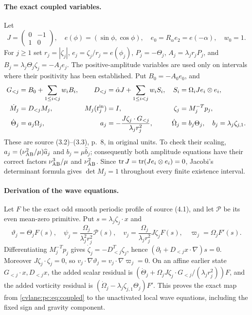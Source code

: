 \paragraph{The exact coupled variables.}
Let
\[
 J=\begin{pmatrix}0&-1\\1&0\end{pmatrix},\quad
 e(\phi)=(\sin\phi,\cos\phi),\quad e_0=R_\alpha e_2=e(-\alpha),\quad w_0=1.
\]
For $j\ge1$ set $r_j=|\zeta_j|$, $e_j=\zeta_j/r_j=e(\phi_j)$, $P_j=-\Theta_j$, $A_j=\lambda_jr_jP_j$, and $B_j=\lambda_j\Theta_j\zeta_j=-A_je_j$. The positive-amplitude variables are used only on intervals where their positivity has been established. Put $B_0=-A_0e_0$, and
\begin{equation}\label{cvlane:pc:eq:coupled}
 \begin{aligned}
 G_{<j}&=B_0+\sum_{1\le i<j}w_iB_i,
 &D_{<j}&=\dot\alpha J+\sum_{1\le i<j}w_iS_i,
 &S_i&=\Omega_iJe_i\otimes e_i,\\
 \dot M_j&=D_{<j}M_j,
 &M_j(t_j^{\rm in})&=I,
 &\zeta_j&=M_j^{-T}p_j,\\
 \dot\Theta_j&=a_j\Omega_j,
 &a_j&=-\frac{J\zeta_j\cdot G_{<j}}{\lambda_jr_j^2},
 &\dot\Omega_j&=b_j\Theta_j,\quad b_j=\lambda_j\zeta_{j,1}.
 \end{aligned}
\end{equation}
These are source (3.2)--(3.3), p.~8, in original units. To check their scaling, $a_j=(\nu_{\mathrm{AB}}^2/\mu)\widehat a_j$ and $b_j=\mu\widehat b_j$; consequently both amplitude equations have their correct factors $\nu_{\mathrm{AB}}^3/\mu$ and $\nu_{\mathrm{AB}}^2$. Since $\operatorname{tr} J=\operatorname{tr}(Je_i\otimes e_i)=0$, Jacobi's determinant formula gives $\det M_j=1$ throughout every finite existence interval.

\paragraph{Derivation of the wave equations.}
Let $F$ be the exact odd smooth periodic profile of source (4.1), and let $\mathcal P$ be its even mean-zero primitive. Put $s=\lambda_j\zeta_j\cdot x$ and
\[
 \vartheta_j=\Theta_jF(s),\quad
 \psi_j=\frac{\Omega_j}{\lambda_j^2r_j^2}\mathcal P(s),\quad
 v_j=\frac{\Omega_j}{\lambda_jr_j^2}J\zeta_j F(s),\quad
 \varpi_j=\Omega_jF'(s).
\]
Differentiating $M_j^{-T}p_j$ gives $\dot\zeta_j=-D_{<j}^T\zeta_j$, hence $(\partial_t+D_{<j}x\cdot\nabla)s=0$. Moreover $J\zeta_j\cdot\zeta_j=0$, so $v_j\cdot\nabla\vartheta_j=v_j\cdot\nabla\varpi_j=0$. On an affine earlier state $G_{<j}\cdot x,D_{<j}x$, the added scalar residual is $(\dot\Theta_j+\Omega_jJ\zeta_j\cdot G_{<j}/(\lambda_jr_j^2))F$, and the added vorticity residual is $(\dot\Omega_j-\lambda_j\zeta_{j,1}\Theta_j)F'$. This proves the exact map from \eqref{cvlane:pc:eq:coupled} to the unactivated local wave equations, including the fixed sign and gravity component.

